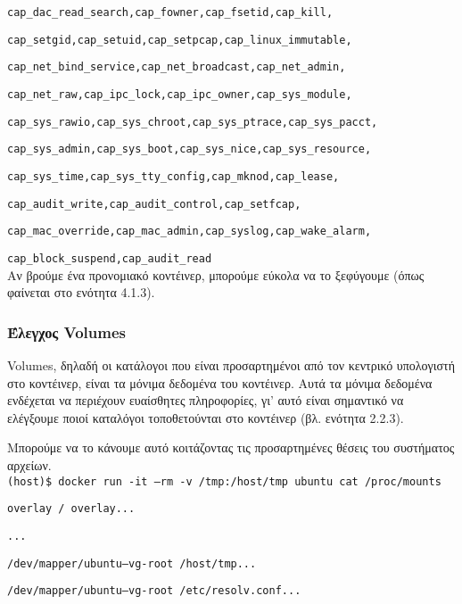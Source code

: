 \texttt{\textlatin{cap\_dac\_read\_search,cap\_fowner,cap\_fsetid,cap\_kill,}}

\texttt{\textlatin{cap\_setgid,cap\_setuid,cap\_setpcap,cap\_linux\_immutable,}}

\texttt{\textlatin{cap\_net\_bind\_service,cap\_net\_broadcast,cap\_net\_admin,}}

\texttt{\textlatin{cap\_net\_raw,cap\_ipc\_lock,cap\_ipc\_owner,cap\_sys\_module,}}

\texttt{\textlatin{cap\_sys\_rawio,cap\_sys\_chroot,cap\_sys\_ptrace,cap\_sys\_pacct,}}

\texttt{\textlatin{cap\_sys\_admin,cap\_sys\_boot,cap\_sys\_nice,cap\_sys\_resource,}}

\texttt{\textlatin{cap\_sys\_time,cap\_sys\_tty\_config,cap\_mknod,cap\_lease,}}

\texttt{\textlatin{cap\_audit\_write,cap\_audit\_control,cap\_setfcap,}}

\texttt{\textlatin{cap\_mac\_override,cap\_mac\_admin,cap\_syslog,cap\_wake\_alarm,}}

\texttt{\textlatin{cap\_block\_suspend,cap\_audit\_read}} \\

Αν βρούμε ένα προνομιακό κοντέινερ, μπορούμε εύκολα να το ξεφύγουμε (όπως
φαίνεται στο ενότητα 4.1.3).

\subsubsection{Έλεγχος \textlatin{Volumes}}

\textlatin{Volumes}, δηλαδή οι κατάλογοι που είναι προσαρτημένοι από τον
κεντρικό υπολογιστή στο κοντέινερ, είναι τα μόνιμα δεδομένα του κοντέινερ. Αυτά
τα μόνιμα δεδομένα ενδέχεται να περιέχουν ευαίσθητες πληροφορίες, γι' αυτό είναι
σημαντικό να ελέγξουμε ποιοί καταλόγοι τοποθετούνται στο κοντέινερ (βλ.
ενότητα 2.2.3).

Μπορούμε να το κάνουμε αυτό κοιτάζοντας τις προσαρτημένες θέσεις του συστήματος
αρχείων. \\

\texttt{\textlatin{(host)\$ docker run -it --rm -v /tmp:/host/tmp ubuntu cat /proc/mounts}}

\texttt{\textlatin{overlay / overlay...}}

\texttt{\textlatin{...}}

\texttt{\textlatin{/dev/mapper/ubuntu--vg-root /host/tmp...}}

\texttt{\textlatin{/dev/mapper/ubuntu--vg-root /etc/resolv.conf...}}

